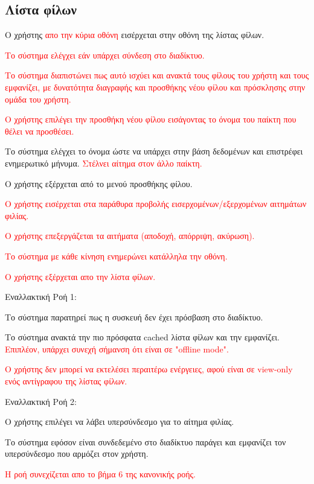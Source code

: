 \subsection{Λίστα φίλων}
\label{sec:friendslist}
\begin{enumerate}
\item Ο χρήστης \textcolor{red}{απο την κύρια οθόνη} εισέρχεται στην οθόνη της λίστας φίλων.
\textcolor{red}{
\item Το σύστημα ελέγχει εάν υπάρχει σύνδεση στο διαδίκτυο.
\item Το σύστημα διαπιστώνει πως αυτό ισχύει και ανακτά τους φίλους του χρήστη και τους εμφανίζει, με δυνατότητα διαγραφής και προσθήκης νέου φίλου και πρόσκλησης στην ομάδα του χρήστη.
\item Ο χρήστης επιλέγει την προσθήκη νέου φίλου εισάγοντας το όνομα του παίκτη που θέλει να προσθέσει.}
\item Το σύστημα ελέγχει το όνομα ώστε να υπάρχει στην βάση δεδομένων και επιστρέφει ενημερωτικό μήνυμα. \textcolor{red}{Στέλνει αίτημα στον άλλο παίκτη.}
\item Ο χρήστης εξέρχεται από το μενού προσθήκης φίλου.

\textcolor{red}{
\item Ο χρήστης εισέρχεται στα παράθυρα προβολής εισερχομένων/εξερχομένων αιτημάτων φιλίας.
\item Ο χρήστης επεξεργάζεται τα αιτήματα (αποδοχή, απόρριψη, ακύρωση).
\item Το σύστημα με κάθε κίνηση ενημερώνει κατάλληλα την οθόνη.
\item Ο χρήστης εξέρχεται απο την λίστα φίλων.
}
\end{enumerate}


Εναλλακτική Ροή 1:
\begin{enumerate}[label=3..\alph*.,ref=3..\alph*]
\item Το σύστημα παρατηρεί πως η συσκευή δεν έχει πρόσβαση στο διαδίκτυο.
\item Το σύστημα ανακτά την πιο πρόσφατα cached λίστα φίλων και την εμφανίζει. \textcolor{red}{Επιπλέον, υπάρχει συνεχή σήμανση ότι είναι σε "offline mode".}
\textcolor{red}{
\item Ο χρήστης δεν μπορεί να εκτελέσει περαιτέρω ενέργειες, αφού είναι σε view-only ενός αντίγραφου της λίστας φίλων.
}
\end{enumerate}

Εναλλακτική Ροή 2:
\begin{enumerate}[label=4.\alph*.,ref=4.\alph*]
\item Ο χρήστης επιλέγει να λάβει υπερσύνδεσμο για το αίτημα φιλίας.
\item Το σύστημα εφόσον είναι συνδεδεμένο στο διαδίκτυο παράγει και εμφανίζει τον υπερσύνδεσμο που αρμόζει στον χρήστη.
\textcolor{red}{
\item Η ροή συνεχίζεται απο το βήμα 6 της κανονικής ροής.
}
\end{enumerate}

